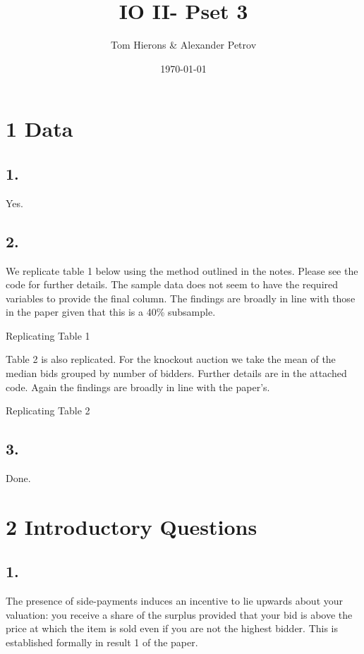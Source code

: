 \documentclass[12pt]{article}
\title{IO II- Pset 3}
\author{Tom Hierons \& Alexander Petrov }
\date\today
\newcommand{\1}{\mathbbm{1}}
\begin{document}
\maketitle 
\section*{1 Data}
\subsection*{1.}
Yes.
\subsection*{2.}
We replicate table 1 below using the method outlined in the notes. Please see the code for further details. The sample data does not seem to have the required variables to provide the final column. The findings are broadly in line with those in the paper given that this is a 40\% subsample.
\begin{table}[H]
    \centering
    \caption{Replicating Table 1}
    
    \label{tab:my_label}
\end{table}

Table 2 is also replicated. For the knockout auction we take the mean of the median bids grouped by number of bidders. Further details are in the attached code. Again the findings are broadly in line with the paper's. 
\begin{table}[H]
    \centering
    \caption{Replicating Table 2}
    
    \label{tab:my_label}
\end{table}
\subsection*{3.}
Done. 

\section*{2 Introductory Questions}
\subsection*{1.}
The presence of side-payments induces an incentive to lie upwards about your valuation: you receive a share of the surplus provided that your bid is above the price at which the item is sold even if you are not the highest bidder. This is established formally in result 1 of the paper.
\end{document}
